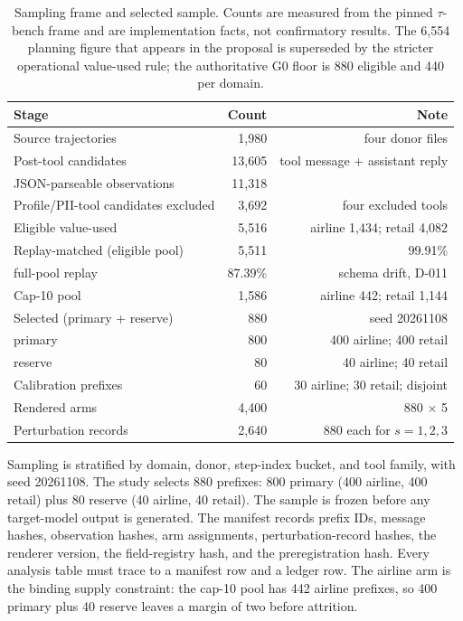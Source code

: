 \documentclass[a4paper,fleqn]{cas-sc}
\begin{document}
\begin{table}[pos=htbp]
  \centering
  \caption{Sampling frame and selected sample. Counts are measured from the pinned $\tau$-bench
  frame and are implementation facts, not confirmatory results. The 6{,}554 planning figure that
  appears in the proposal is superseded by the stricter operational value-used rule; the
  authoritative G0 floor is 880 eligible and 440 per domain.}
  \label{tab:supply}
  \small
  \begin{tabular}{>{\raggedright\arraybackslash}p{6.6cm}rr}
    \toprule
    \textbf{Stage} & \textbf{Count} & \textbf{Note} \\
    \midrule
    Source trajectories                 & 1{,}980 & four donor files \\
    Post-tool candidates                & 13{,}605 & tool message + assistant reply \\
    JSON-parseable observations         & 11{,}318 & \\
    Profile/PII-tool candidates excluded & 3{,}692 & four excluded tools \\
    Eligible value-used                 & 5{,}516 & airline 1{,}434; retail 4{,}082 \\
    Replay-matched (eligible pool)      & 5{,}511 & 99.91\% \\
    \quad full-pool replay              & 87.39\% & schema drift, D-011 \\
    Cap-10 pool                         & 1{,}586 & airline 442; retail 1{,}144 \\
    Selected (primary + reserve)        & 880 & seed 20261108 \\
    \quad primary                       & 800 & 400 airline; 400 retail \\
    \quad reserve                       & 80 & 40 airline; 40 retail \\
    Calibration prefixes                & 60 & 30 airline; 30 retail; disjoint \\
    Rendered arms                       & 4{,}400 & 880 $\times$ 5 \\
    Perturbation records                & 2{,}640 & 880 each for $s=1,2,3$ \\
    \bottomrule
  \end{tabular}
\end{table}

Sampling is stratified by domain, donor, step-index bucket, and tool family, with seed 20261108.
The study selects 880 prefixes: 800 primary (400 airline, 400 retail) plus 80 reserve (40
airline, 40 retail). The sample is frozen before any target-model output is generated. The
manifest records prefix IDs, message hashes, observation hashes, arm assignments,
perturbation-record hashes, the renderer version, the field-registry hash, and the preregistration
hash. Every analysis table must trace to a manifest row and a ledger row. The airline arm is the
binding supply constraint: the cap-10 pool has 442 airline prefixes, so 400 primary plus 40
reserve leaves a margin of two before attrition.
\end{document}
